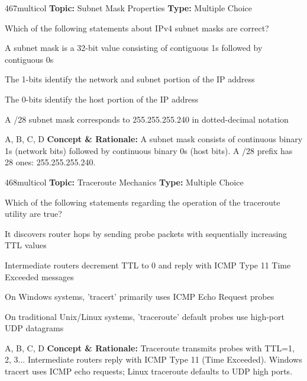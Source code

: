 \begin{qcard}{467}{multicol}
\textcolor{darkslate!75}{\small\textbf{Topic:} Subnet Mask Properties \hfill \textbf{Type:} Multiple Choice}\vspace{0.4em}\par
Which of the following statements about IPv4 subnet masks are correct?
\begin{qoptions}
\item A subnet mask is a 32-bit value consisting of contiguous 1s followed by contiguous 0s
\item The 1-bits identify the network and subnet portion of the IP address
\item The 0-bits identify the host portion of the IP address
\item A /28 subnet mask corresponds to 255.255.255.240 in dotted-decimal notation
\end{qoptions}
\end{qcard}
\nopagebreak
\begin{explainbox}{A, B, C, D}
\textbf{Concept \& Rationale:} A subnet mask consists of continuous binary 1s (network bits) followed by continuous binary 0s (host bits). A /28 prefix has 28 ones: 255.255.255.240.
\end{explainbox}

\begin{qcard}{468}{multicol}
\textcolor{darkslate!75}{\small\textbf{Topic:} Traceroute Mechanics \hfill \textbf{Type:} Multiple Choice}\vspace{0.4em}\par
Which of the following statements regarding the operation of the traceroute utility are true?
\begin{qoptions}
\item It discovers router hops by sending probe packets with sequentially increasing TTL values
\item Intermediate routers decrement TTL to 0 and reply with ICMP Type 11 Time Exceeded messages
\item On Windows systems, 'tracert' primarily uses ICMP Echo Request probes
\item On traditional Unix/Linux systems, 'traceroute' default probes use high-port UDP datagrams
\end{qoptions}
\end{qcard}
\nopagebreak
\begin{explainbox}{A, B, C, D}
\textbf{Concept \& Rationale:} Traceroute transmits probes with TTL=1, 2, 3... Intermediate routers reply with ICMP Type 11 (Time Exceeded). Windows tracert uses ICMP echo requests; Linux traceroute defaults to UDP high ports.
\end{explainbox}

